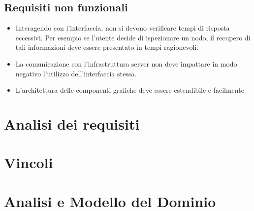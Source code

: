 \subsection{Requisiti non funzionali}
\begin{itemize}
	\item Interagendo con l'interfaccia, non si devono verificare tempi di risposta eccessivi. Per esempio se l'utente decide di ispezionare un nodo, il recupero di tali informazioni deve essere presentato in tempi ragionevoli.
	\item  La comunicazione con l'infrastruttura server non deve impattare in modo negativo l'utilizzo dell'interfaccia stessa. 
	\item L'architettura delle componenti grafiche deve essere estendibile e facilmente 
\end{itemize}

\section{Analisi dei requisiti}

\section{Vincoli}

\section{Analisi e Modello del Dominio}
